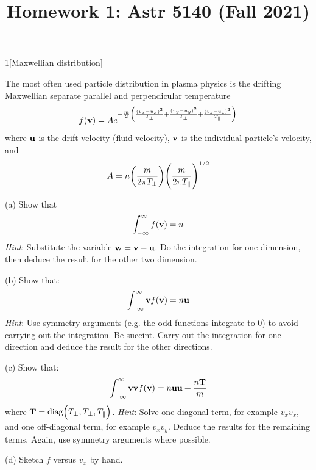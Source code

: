 \documentclass[12pt]{article}
\title{Homework 1: Astr 5140 (Fall 2021)}
\begin{document}
\maketitle


\begin{problem}{1}[Maxwellian distribution]

The most often used particle distribution in plasma physics is the drifting
Maxwellian separate parallel and perpendicular temperature
\begin{equation}\label{p1:3d_gaussian}
    f(\vb{v})=Ae^{-\frac{m}{2}\qty(
        \frac{(v_x-u_x)^2}{T_\perp}+
        \frac{(v_y-u_y)^2}{T_\perp}+
        \frac{(v_z-u_z)^2}{T_\|}
    )}
\end{equation}
where $\vb{u}$ is the drift velocity (fluid velocity), $\vb{v}$ is the
individual particle's velocity, and
\begin{equation}
    A=n\qty(\frac{m}{2\pi T_\perp})\qty(\frac{m}{2\pi T_\|})^{1/2} 
\end{equation}

(a) Show that
\begin{equation}
    \int_{-\infty}^\infty f(\vb{v})=n  
\end{equation}
\textit{Hint}: Substitute the variable $\vb{w}=\vb{v}-\vb{u}$. Do the 
integration for one dimension, then deduce the result for the other two 
dimension.

(b) Show that:
\begin{equation}\label{p1b:show}
    \int_{-\infty}^\infty\vb{v}f(\vb{v})=n\vb{u} 
\end{equation}
\textit{Hint}: Use symmetry arguments (e.g. the odd functions integrate to 0) to
avoid carrying out the integration. Be succint. Carry out the integration for
one direction and deduce the result for the other directions.

(c) Show that:
\begin{equation}
    \int_{-\infty}^\infty \vb{v}\vb{v}f(\vb{v})=n\vb{u}\vb{u}+\frac{n\vb{T}}{m} 
\end{equation}
where $\vb{T}=\text{diag}\qty(T_\perp,T_\perp,T_\|)$. \textit{Hint}: Solve one
diagonal term, for example $v_xv_x$, and one off-diagonal term, for example
$v_xv_y$. Deduce the results for the remaining terms. Again, use symmetry
arguments where possible.

(d) Sketch $f$ versus $v_x$ by hand.



\end{problem}
\end{document}
